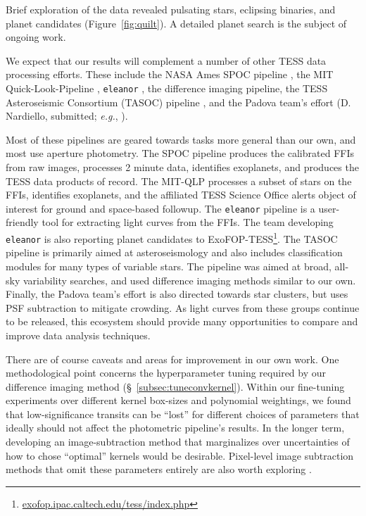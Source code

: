 \documentclass[12pt,twocolumn,tighten]{aastex62}
\begin{document}
Brief exploration of the data revealed pulsating stars, eclipsing
binaries, and planet candidates (Figure~\ref{fig:quilt}).  A detailed
planet search is the subject of ongoing work.

We expect that our results will complement a number of other
TESS data processing efforts.
These include the NASA Ames SPOC pipeline \citep{jenkins_spoc_2010}, the MIT
Quick-Look-Pipeline \citep{huang_tess_2018}, \texttt{eleanor}
\citep{feinstein_eleanor_2019}, the \citet{oelkers_precision_2018}
difference imaging pipeline, the TESS Asteroseismic Consortium (TASOC)
pipeline \citep{lund_k2p_2015,handberg_tess_2019}, and the Padova
team's effort (D{.} Nardiello, submitted; {\it e.g.},
\citealt{libralato_psf-based_2016}). 

Most of these pipelines are geared towards tasks more general than our
own, and most use aperture photometry.  The SPOC pipeline produces the
calibrated FFIs from raw images, processes 2 minute data, identifies
exoplanets, and produces the TESS data products of record.  The
MIT-QLP processes a subset of stars on the FFIs, identifies
exoplanets, and the affiliated TESS Science Office alerts object of
interest for ground and space-based followup.  The \texttt{eleanor}
pipeline is a user-friendly tool for extracting light curves from the
FFIs.  The team developing \texttt{eleanor} is also reporting planet candidates
to ExoFOP-TESS\footnote{\url{exofop.ipac.caltech.edu/tess/index.php}}.  The TASOC pipeline is primarily aimed at
asteroseismology and also includes classification modules for many types of variable stars. The
\citeauthor{oelkers_precision_2018} pipeline was aimed at broad,
all-sky variability searches, and used difference imaging methods
similar to our own.  Finally, the Padova team's effort is also
directed towards star clusters, but uses PSF subtraction to mitigate
crowding.  As light curves from these groups continue to be released, this ecosystem should provide many opportunities to compare and improve data analysis techniques. 

There are of course caveats and areas for improvement in our
own work.  One methodological point concerns the hyperparameter tuning
required by our difference imaging method
(\S~\ref{subsec:tuneconvkernel}).  Within our fine-tuning experiments
over different kernel box-sizes and polynomial weightings, we found
that low-significance transits  can be ``lost'' for
different choices of parameters that ideally should not affect the
photometric pipeline's results.  In the longer term, developing an
image-subtraction method that marginalizes over uncertainties of how
to chose ``optimal'' kernels would be desirable.  Pixel-level image
subtraction methods that omit these parameters entirely are also worth
exploring \citep{wang_pixel-level_2017}.
\end{document}
